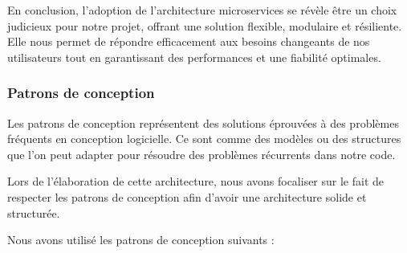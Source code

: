 \par En conclusion, l'adoption de l'architecture microservices se révèle être un choix judicieux pour notre projet, offrant une solution flexible, modulaire et résiliente.
Elle nous permet de répondre efficacement aux besoins changeants de nos utilisateurs tout en garantissant des performances et une fiabilité optimales.
\subsubsection{Patrons de conception}
\par Les patrons de conception représentent des solutions éprouvées à des problèmes fréquents en conception logicielle. Ce sont comme des modèles ou des structures que l'on peut adapter pour résoudre des problèmes récurrents dans notre code\cite{design_pattern}.
\par Lors de l'élaboration de cette architecture, nous avons focaliser sur le fait de respecter les patrons de conception afin d'avoir une architecture solide et structurée.
\par Nous avons utilisé les patrons de conception suivants :
